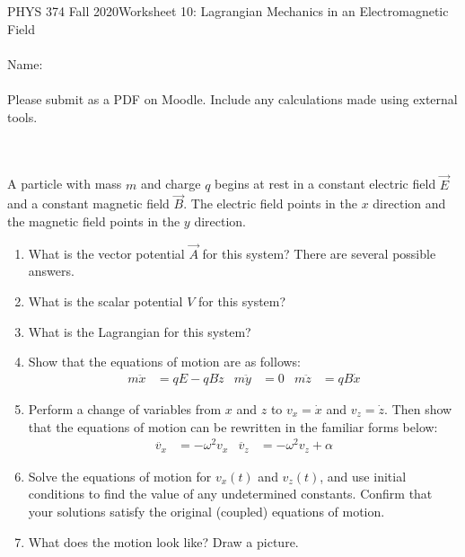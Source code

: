 \documentclass[12pt]{article}
\begin{document}
PHYS 374 Fall 2020\hfill Worksheet 10: Lagrangian Mechanics in an Electromagnetic Field\\
\\
Name:\\
\\
Please submit as a PDF on Moodle. Include any calculations made using external tools.

\hrulefill
\\
\\
A particle with mass $m$ and charge $q$ begins at rest in a constant electric field $\vec{E}$ and a constant magnetic field $\vec{B}$. The electric field points in the $x$ direction and the magnetic field points in the $y$ direction. 
\begin{enumerate}
    \item What is the vector potential $\vec{A}$ for this system? There are several possible answers.
    \item What is the scalar potential $V$ for this system?
    \item What is the Lagrangian for this system? 
    \item Show that the equations of motion are as follows:
    \begin{align*}
        m \ddot{x} &= qE - qB\dot{z} &
        m \ddot{y} &= 0 &
        m \ddot{z} &= qB \dot{x}
    \end{align*}
    \item Perform a change of variables from $x$ and $z$ to $v_x=\dot{x}$ and $v_z=\dot{z}$. Then show that the equations of motion can be rewritten in the familiar forms below:
    \begin{align*}
        \ddot{v_x} &= -\omega^2 v_x &
        \ddot{v_z} &= -\omega^2 v_z + \alpha
    \end{align*}
    \item Solve the equations of motion for $v_x(t)$ and $v_z(t)$, and use initial conditions to find the value of any undetermined constants. Confirm that your solutions satisfy the original (coupled) equations of motion. 
    \item What does the motion look like? Draw a picture. 
\end{enumerate}
\end{document}
